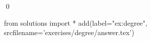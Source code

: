 \begin{ex}
  \label{ex:degree}
  
  \qed
\end{ex}
\begin{python0}
from solutions import *
add(label="ex:degree",
    srcfilename='exercises/degree/answer.tex') 
\end{python0}                              
